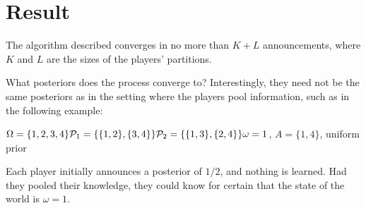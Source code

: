 \section*{Result}
The algorithm described converges in no more than $K+L$ announcements, where $K$ and $L$ are the sizes of the players' partitions.

What posteriors does the process converge to? Interestingly, they need not be the same posteriors as in the setting where the players pool information, such as in the following example:

$\Omega=\{1,2,3,4\}\\\mathcal{P}_1=\{\{1,2\},\{3,4\}\}\\\mathcal{P}_2=\{\{1,3\},\{2,4\}\}\\\omega=1$, $A=\{1,4\}$, uniform prior

Each player initially announces a posterior of $1/2$, and nothing is learned.  Had they pooled their knowledge, they could know for certain that the state of the world is $\omega=1$.


